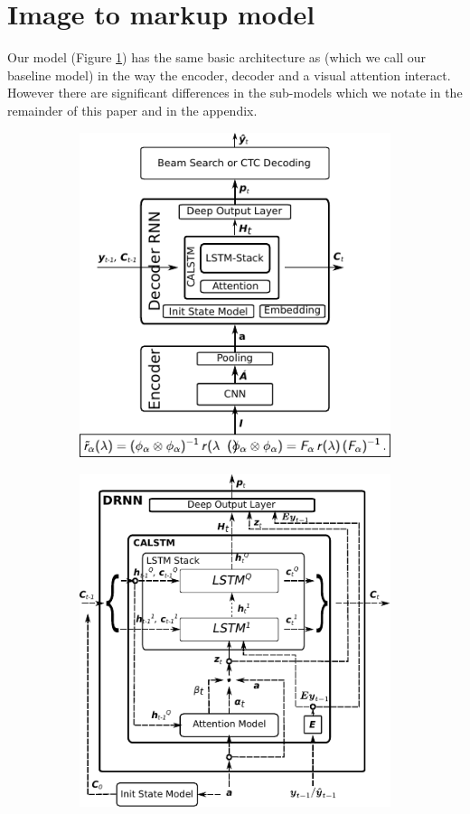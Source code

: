 \documentclass{article}
\newcommand{\suppmat}{appendix}
\begin{document}
\section{Image to markup model}
Our model (Figure \ref{fig-i2l-brief}) has the same basic architecture as \cite{Xu2015ShowAA} (which we call our baseline model) in the way the encoder, decoder and a visual attention interact. However there are significant differences in the sub-models which we notate in the remainder of this paper and in the \suppmat.
\begin{figure}[!h]
	\begin{subfigure}{0.5\textwidth}
		\includegraphics{i2l_brief.pdf}
		\centering
		\caption{}
		\label{fig-i2l-brief}
	\end{subfigure}
	\begin{subfigure}{0.5\textwidth}
		\includegraphics{decoder.pdf}

\end{subfigure}
\end{figure}
\end{document}
